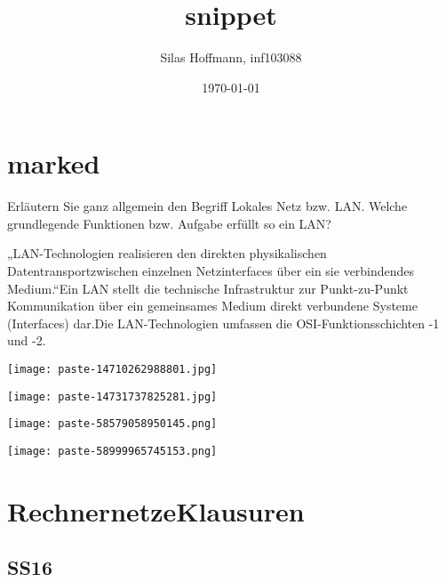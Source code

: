 \documentclass{article}
\title{snippet}
\author{Silas Hoffmann, inf103088}
\date{\today}
\begin{document}
\maketitle
\vspace{0.5cm}
\tableofcontents
\clearpage

\section{marked}
\begin{tcolorbox}[colback=white!10!white,colframe=lightgray!75!black,
  savelowerto=\jobname_ex.tex,breakable,enhanced,lines before break=40]

\justifying
Erläutern Sie ganz allgemein den Begriff Lokales Netz bzw. LAN. Welche grundlegende Funktionen bzw. Aufgabe erfüllt so ein LAN?

\tcblower

\justifying
„LAN-Technologien realisieren den direkten physikalischen Datentransportzwischen einzelnen Netzinterfaces über ein sie verbindendes Medium.“Ein LAN stellt die technische Infrastruktur zur Punkt-zu-Punkt Kommunikation über ein gemeinsames Medium direkt verbundene Systeme (Interfaces) dar.Die LAN-Technologien umfassen die OSI-Funktionsschichten -1 und -2.\begin{center}
\texttt{[image: paste-14710262988801.jpg]}
\end{center}
\begin{center}
\texttt{[image: paste-14731737825281.jpg]}
\end{center}
\begin{center}
\texttt{[image: paste-58579058950145.png]}
\end{center}
\begin{center}
\texttt{[image: paste-58999965745153.png]}
\end{center}

\end{tcolorbox}
\section{RechnernetzeKlausuren}
\subsection{SS16}
\end{document}
